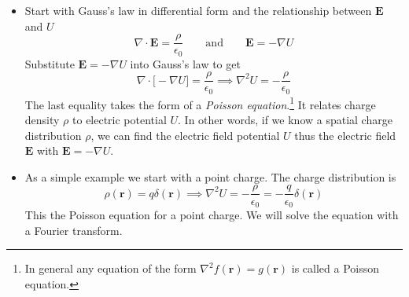 \documentclass[11pt, a4paper]{article}
\newcommand{\eqtext}[1]{\qquad \text{#1} \qquad}
\renewcommand{\vec}[1]{\bm{#1}} %
\renewcommand{\r}{\vec{r}}
\newcommand{\E}{\vec{E}}  %
\newcommand{\ee}{\epsilon_{0}}  %
\renewcommand{\div}{\nabla \cdot}
\renewcommand{\grad}{\nabla}
\begin{document}
\begin{itemize}
	\item Start with Gauss's law in differential form and the relationship between $ \E $ and $ U $
	\begin{equation*}
		\div \vec{E} = \frac{\rho}{\ee} \eqtext{and} \vec{E} = - \grad U
	\end{equation*}
	Substitute $ \E = - \grad U $ into Gauss's law to get
	\begin{equation*}
		\div \big[-\grad U\big] = \frac{\rho}{\ee} \implies \nabla^{2}U = -\frac{\rho}{\ee}
	\end{equation*}
	The last equality takes the form of a \textit{Poisson equation}.\footnote{In general any equation of the form $ \nabla^{2}f(\r) = g(\r) $ is called a Poisson equation.} It relates charge density $ \rho $ to electric potential $ U $. In other words, if we know a spatial charge distribution $ \rho $, we can find the electric field potential $ U $ thus the electric field $ \vec{E} $ with $ \E = - \grad U $.
	
	\item As a simple example we start with a point charge. The charge distribution is
	\begin{equation*}
		\rho(\vec{r}) = q \delta(\vec{r}) \implies \nabla^{2}U = -\frac{\rho}{\ee} = - \frac{q}{\ee}\delta(\r)
	\end{equation*}
	This the Poisson equation for a point charge. We will solve the equation with a Fourier transform.
	

\end{itemize}
\end{document}
